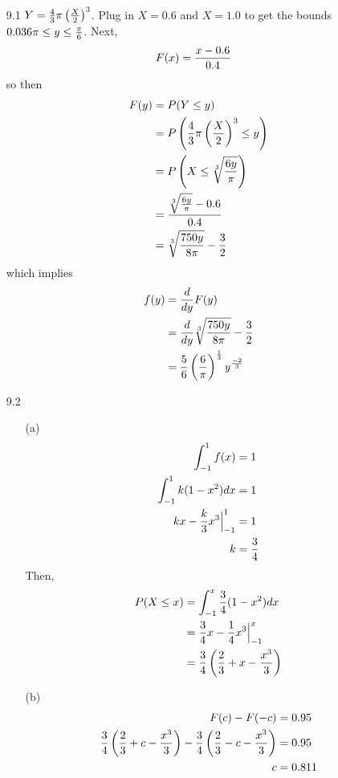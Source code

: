 \documentclass[english, 11pt]{article}
\begin{document}
  \begin{itemize}
    \item[9.1]
    $Y = \frac{4}{3} \pi \left( \frac{X}{2} \right)^3$. Plug in $X =0.6$ and $X = 1.0$ to get the bounds $0.036\pi\leq y \leq \frac{\pi}{6}$. Next,
    \begin{align*}
      F(x) & = \frac{x - 0.6}{0.4}
    \end{align*}
    so then
    \begin{align*}
      F(y) & = P(Y \leq y) \\
           & = P \left( \frac{4}{3} \pi \left( \frac{X}{2} \right)^3 \leq y \right) \\
           & = P\left(X \leq \sqrt[3]{\frac{6y}{\pi}} \right) \\
           & = \frac{\sqrt[3]{\frac{6y}{\pi}}  - 0.6}{0.4} \\
           & = \sqrt[3]{\frac{750y}{8\pi}} - \frac{3}{2}
    \end{align*}
    which implies
    \begin{align*}
      f(y) & = \frac{d}{dy} F(y) \\
           & = \frac{d}{dy} \sqrt[3]{\frac{750y}{8\pi}} - \frac{3}{2} \\
           & = \frac{5}{6} \left( \frac{6}{\pi} \right)^{\frac{1}{3}} y^{\frac{-2}{3}}
    \end{align*}

    \item[9.2]
    \begin{itemize}
      \item[(a)]
      \begin{align*}
        \int_{-1}^1 f(x) & = 1 \\
        \int_{-1}^1 k(1-x^2) dx & = 1 \\
        kx - \frac{k}{3}x^3 \Big|_{-1}^1 & = 1 \\
        k & = \frac{3}{4}
      \end{align*}
      Then,
      \begin{align*}
        P(X \leq x) & = \int_{-1}^x \frac{3}{4}(1-x^2) dx \\
        & = \frac{3}{4}x - \frac{1}{4}x^3 \Big|_{-1}^x \\
        & = \frac{3}{4} \left( \frac{2}{3} + x - \frac{x^3}{3} \right)
      \end{align*}
      \item[(b)]
      \begin{align*}
        F(c) - F(-c) & = 0.95 \\
        \frac{3}{4} \left( \frac{2}{3} + c - \frac{x^3}{3} \right) - \frac{3}{4} \left( \frac{2}{3} - c - \frac{x^3}{3} \right) & = 0.95 \\
        c & = 0.811
      \end{align*}
    \end{itemize}


\end{itemize}
\end{document}
